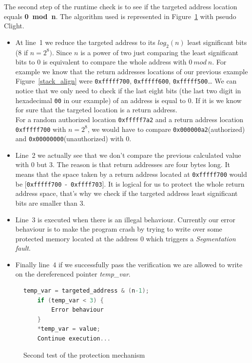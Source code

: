 \documentclass[11pt]{sdm}
\begin{document}
The second step of the runtime check is to see if the targeted address location equals \textbf{0~mod~n}.
The algorithm used is represented in Figure~\ref{classic_check} with pseudo Clight.
\begin{itemize}
	\item At line~1 we reduce the targeted address to its $log_2(n)$ least significant bits (8 if $n=2^8)$.
Since $n$ is a power of two just comparing the least significant bits to $0$ is equivalent to compare the whole address with $0~mod~n$.
For example we know that the return addresses locations of our previous example Figure~\ref{stack_align} were \texttt{0xfffff700}, \texttt{0xfffff600}, \texttt{0xfffff500}\dots
We can notice that we only need to check if the last eight bits (the last two digit in hexadecimal \texttt{00} in our example) of an address is equal to 0.
If it is we know for sure that the targeted location is a return address.\\
For a random authorized location \texttt{0xfffff7a2} and a return address location \texttt{0xfffff700} with $n=2^8$, we would have to compare \texttt{0x000000a2}(authorized) and \texttt{0x00000000}(unauthorized) with $0$. 
	\item Line~2 we actually see that we don't compare the previous calculated value with 0 but 3. The reason is that return addresses are four bytes long.
		It means that the space taken by a return address located at \texttt{0xfffff700} would be [\texttt{0xfffff700}~-~\texttt{0xffff703}]. It is logical for us to protect the whole return address space, that's why we check if the targeted address least significant bits are smaller than 3.
	\item Line~3 is executed when there is an illegal behaviour. Currently our error behaviour is to make the program crash by trying to write over some protected memory located at the address 0 which triggers a \textit{Segmentation fault}.
	\item Finally line~4 if we successfully pass the verification we are allowed to write on the dereferenced pointer \textit{temp\_var}.
\end{itemize}

\begin{figure}[!ht]
\centering
\begin{lstlisting}[language=C]
	temp_var = targeted_address & (n-1);
	if (temp_var < 3) {
		Error behaviour
	} 
	*temp_var = value;
	Continue execution...
\end{lstlisting}
\caption{Second test of the protection mechanism}
\label{classic_check}
\end{figure}
\end{document}
